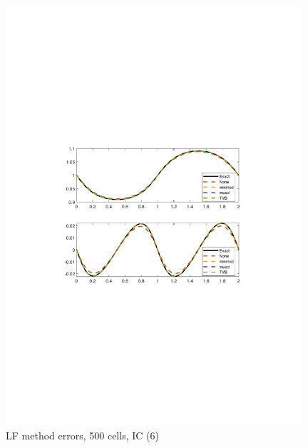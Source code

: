 \documentclass[11pt,a4paper]{article}
\begin{document}
\begin{figure}[!htb]
    \centering
    \includegraphics[width=11cm]{2_2_a_IC_2_LF.pdf}
    \caption{LF method errors, 500 cells, IC (6)}
    \label{fig:LF_IC_2}
\end{figure}
\end{document}
